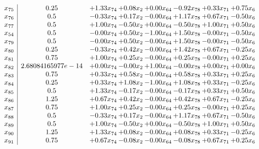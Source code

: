 \documentclass[8pt]{article}
\begin{document}
\[\begin{array}{c| c c@{\hskip 2pt} c@{\hskip 2pt} c@{\hskip 2pt} c@{\hskip 2pt} c@{\hskip 2pt} c@{\hskip 2pt} }
 x_{75}   &  0.25 & +  1.33 x_{74} & +  0.08 x_{2} & +  0.00 x_{64} & -0.92 x_{78} & +  0.33 x_{71} & +  0.75 x_{6}\\
 x_{76}   &  0.5 & -0.33 x_{74} & +  0.17 x_{2} & -0.00 x_{64} & +  1.17 x_{78} & +  0.67 x_{71} & -0.50 x_{6}\\
 x_{77}   &  0.5 & +  1.00 x_{74} & -0.50 x_{2} & +  0.00 x_{64} & -0.50 x_{78} & +  1.00 x_{71} & +  0.50 x_{6}\\
 x_{54}   &  0.5 & -0.00 x_{74} & +  0.50 x_{2} & -1.00 x_{64} & +  1.50 x_{78} & -0.00 x_{71} & -0.50 x_{6}\\
 x_{79}   &  0.5 & -0.00 x_{74} & +  0.50 x_{2} & -0.00 x_{64} & +  1.50 x_{78} & -0.00 x_{71} & -0.50 x_{6}\\
 x_{80}   &  0.25 & -0.33 x_{74} & +  0.42 x_{2} & -0.00 x_{64} & +  1.42 x_{78} & +  0.67 x_{71} & -0.25 x_{6}\\
 x_{81}   &  0.75 & +  1.00 x_{74} & +  0.25 x_{2} & -0.00 x_{64} & +  0.25 x_{78} & -0.00 x_{71} & +  0.25 x_{6}\\
 x_{82}   &  2.68084165977e-14 & +  0.00 x_{74} & -0.00 x_{2} & +  1.00 x_{64} & -0.00 x_{78} & +  0.00 x_{71} & +  0.00 x_{6}\\
 x_{83}   &  0.75 & +  0.33 x_{74} & +  0.58 x_{2} & -0.00 x_{64} & +  0.58 x_{78} & +  0.33 x_{71} & +  0.25 x_{6}\\
 x_{84}   &  0.25 & +  0.33 x_{74} & +  1.08 x_{2} & -1.00 x_{64} & +  1.08 x_{78} & +  0.33 x_{71} & -0.25 x_{6}\\
 x_{85}   &  0.5 & +  1.33 x_{74} & -0.17 x_{2} & -0.00 x_{64} & -0.17 x_{78} & +  0.33 x_{71} & +  0.50 x_{6}\\
 x_{86}   &  1.25 & +  0.67 x_{74} & +  0.42 x_{2} & -0.00 x_{64} & +  0.42 x_{78} & +  0.67 x_{71} & -0.25 x_{6}\\
 x_{87}   &  0.75 & +  1.00 x_{74} & +  0.25 x_{2} & -0.00 x_{64} & +  0.25 x_{78} & -0.00 x_{71} & +  0.25 x_{6}\\
 x_{88}   &  0.5 & -0.33 x_{74} & +  0.17 x_{2} & -0.00 x_{64} & +  1.17 x_{78} & +  0.67 x_{71} & -0.50 x_{6}\\
 x_{89}   &  0.5 & +  1.00 x_{74} & -0.50 x_{2} & +  0.00 x_{64} & -0.50 x_{78} & +  1.00 x_{71} & +  0.50 x_{6}\\
 x_{90}   &  1.25 & +  1.33 x_{74} & +  0.08 x_{2} & -0.00 x_{64} & +  0.08 x_{78} & +  0.33 x_{71} & -0.25 x_{6}\\
 x_{91}   &  0.75 & +  0.67 x_{74} & -0.08 x_{2} & -0.00 x_{64} & -0.08 x_{78} & +  0.67 x_{71} & +  0.25 x_{6}\\

\end{array}\]
\end{document}
